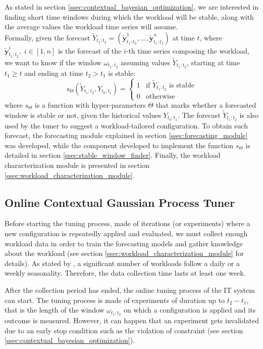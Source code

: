 \documentclass[a4paper, 12pt]{article} %
\begin{document}
	As stated in section \ref{ssec:contextual_bayesian_optimization}, we are interested in finding short time windows during which the workload will be stable, along with the average values the workload time series will assume. \\
	Formally, given the forecast $\tilde{Y}_{t_1:t_2} = (\tilde{\pmb{y}}_{t_1:t_2}^1, ..., \tilde{\pmb{y}}_{t_1:t_2}^n)$ at time $t$, where $\tilde{\pmb{y}}_{t_1:t_2}^i, \; i\in [1, n]$ is the forecast of the $i$-th time series composing the workload, we want to know if the window $\omega_{t_1:t_2}$ assuming values $\tilde{Y}_{t_1:t_2}$, starting at time $t_1 \geq t$ and ending at time $t_2 > t_1$ is stable: 
	\begin{equation}
		s_\Theta(\tilde{Y}_{t_1:t_2}, Y_{t_0:t_1}) = \begin{cases}
			1 & \text{if $\tilde{Y}_{t_1:t_2}$ is stable}\\
			0 & \text{otherwise}
		\end{cases}    
	\end{equation}
	where $s_\Theta$ is a function with hyper-parameters $\Theta$ that marks whether a forecasted window is stable or not, given the historical values $Y_{t_0:t_1}$. The forecast $\tilde{Y}_{t_1:t_2}$ is also used by the tuner to suggest a workload-tailored configuration.
	To obtain such forecast, the forecasting module explained in section \ref{ssec:forecasting_module} was developed, while the component developed to implement the function $s_\Theta$ is detailed in section \ref{ssec:stable_window_finder}. Finally, the workload characterization module is presented in section \ref{ssec:workload_characterization_module}. 
	
	\subsection{Online Contextual Gaussian Process Tuner}
	Before starting the tuning process, made of iterations (or experiments) where a new configuration is repeatedly applied and evaluated, we must collect enough workload data in order to train the forecasting models and gather knowledge about the workload (see section \ref{ssec:workload_characterization_module} for details).
	As stated by \cite{Seagull}, a significant number of workloads follow a daily or a weekly seasonality. Therefore, the data collection time lasts at least one week.
	 
	 After the collection period has ended, the online tuning process of the IT system can start. The tuning process is made of experiments of duration up to $t_2 - t_1$, that is the length of the window $\omega_{t_1:t_2}$ on which a configuration is applied and its outcome is measured.  However, it can happen that an experiment gets invalidated due to an early stop condition such as the violation of constraint (see section \ref{ssec:contextual_bayesian_optimization}).  
	 
\end{document}

